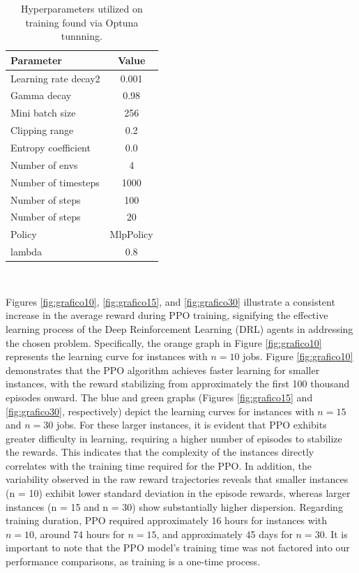 \documentclass{article}
\begin{document}
\begin{table}
\caption{Hyperparameters utilized on training found via Optuna tunnning.} \label{tab:hyperparams}
\centering %
{
\centering %
\begin{tabular}{|l|c|}
\hline
Parameter & Value \\
\hline
Learning rate decay2    &0.001 \\
Gamma decay                & 0.98   \\
Mini batch size            & 256   \\
Clipping range             & 0.2   \\
Entropy coefficient        & 0.0   \\
Number of envs             & 4   \\
Number of timesteps        & 1000   \\
Number of steps            & 100   \\
Number of steps            & 20   \\
Policy                     & MlpPolicy   \\
lambda                     &0.8 \\ 
\hline
\end{tabular}
}
\\
\end{table}


Figures \ref{fig:grafico10}, \ref{fig:grafico15}, and \ref{fig:grafico30} illustrate a consistent increase in the average reward during PPO training, signifying the effective learning process of the Deep Reinforcement Learning (DRL) agents in addressing the chosen problem. Specifically, the orange graph in Figure \ref{fig:grafico10} represents the learning curve for instances with $n=10$ jobs. Figure \ref{fig:grafico10} demonstrates that the PPO algorithm achieves faster learning for smaller instances, with the reward stabilizing from approximately the first 100 thousand episodes onward. The blue and green graphs (Figures \ref{fig:grafico15} and \ref{fig:grafico30}, respectively) depict the learning curves for instances with $n=15$ and $n=30$ jobs. For these larger instances, it is evident that PPO exhibits greater difficulty in learning, requiring a higher number of episodes to stabilize the rewards. This indicates that the complexity of the instances directly correlates with the training time required for the PPO. In addition, the variability observed in the raw reward trajectories reveals that smaller instances (n = 10) exhibit lower standard deviation in the episode rewards, whereas larger instances (n = 15 and n = 30) show substantially higher dispersion. Regarding training duration, PPO required approximately 16 hours for instances with $n=10$, around 74 hours for $n=15$, and approximately 45 days for $n=30$. It is important to note that the PPO model's training time was not factored into our performance comparisons, as training is a one-time process.
\end{document}
